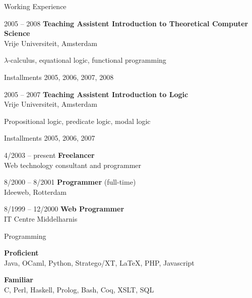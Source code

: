 \documentclass[a4paper,11pt]{article}
\newenvironment{sublist}{%
  \begin{list}{}{%
      \setlength{\itemsep}{0em}\setlength{\parsep}{0em}%
      \setlength{\topsep}{0em}\setlength{\parskip}{0em}%
    }%
}%
{ \end{list} }
\begin{document}
\begin{cv}{}
\begin{cvlist}{Working Experience}
\item[2005 -- 2008]
  {\bf Teaching Assistent Introduction to Theoretical Computer Science}\\
  Vrije Universiteit, Amsterdam
  \begin{sublist}
  \item $\lambda$-calculus, equational logic, functional programming
  \item Installments 2005, 2006, 2007, 2008
  \end{sublist}
\item[2005 -- 2007]
  {\bf Teaching Assistent Introduction to Logic}\\
  Vrije Universiteit, Amsterdam
  \begin{sublist}
  \item Propositional logic, predicate logic, modal logic
  \item Installments 2005, 2006, 2007
  \end{sublist}
\item[4/2003 -- present]
  {\bf Freelancer}\\
  Web technology consultant and programmer
\item[8/2000 -- 8/2001]
  {\bf Programmer} (full-time)\\
  Ideeweb, Rotterdam
\item[8/1999 -- 12/2000]
  {\bf Web Programmer}\\
  IT Centre Middelharnis
\end{cvlist}


\pagebreak


\begin{cvlist}{Programming}
\item
  {\bf Proficient}\\
  Java, OCaml, Python, Stratego/XT, LaTeX, PHP, Javascript
\item
  {\bf Familiar}\\
  C, Perl, Haskell, Prolog, Bash, Coq, XSLT, SQL
\end{cvlist}



\end{cv}
\end{document}
